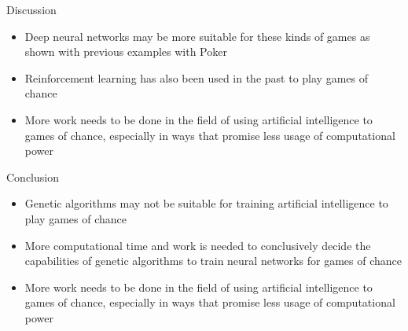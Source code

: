 \documentclass{beamer}
\begin{document}
\begin{frame}{Discussion}
	\begin{itemize}
		\item Deep neural networks may be more suitable for these kinds of games as shown with previous examples with Poker
		\item Reinforcement learning has also been used in the past to play games of chance
		\item More work needs to be done in the field of using artificial intelligence to games of chance, especially in ways that promise less usage of computational power
	\end{itemize}
\end{frame}

\begin{frame}{Conclusion}
	\begin{itemize}
		\item Genetic algorithms may not be suitable for training artificial intelligence to play games of chance
		\item More computational time and work is needed to conclusively decide the capabilities of genetic algorithms to train neural networks for games of chance
		\item More work needs to be done in the field of using artificial intelligence to games of chance, especially in ways that promise less usage of computational power
	\end{itemize}
\end{frame}
\end{document}
